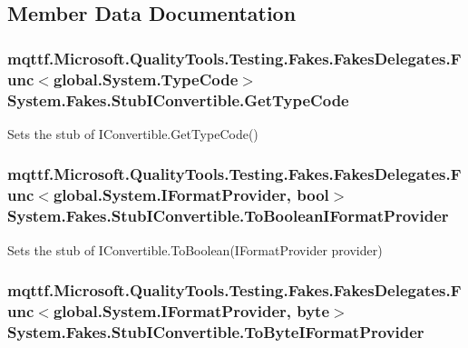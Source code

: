 \subsection{Member Data Documentation}
\hypertarget{class_system_1_1_fakes_1_1_stub_i_convertible_afcb4fd2ad35d314c92a231f3d121a55d}{
\subsubsection[{Get\-Type\-Code}]{\setlength{\rightskip}{0pt plus 5cm}mqttf.\-Microsoft.\-Quality\-Tools.\-Testing.\-Fakes.\-Fakes\-Delegates.\-Func$<$global.\-System.\-Type\-Code$>$ System.\-Fakes.\-Stub\-I\-Convertible.\-Get\-Type\-Code}}\label{class_system_1_1_fakes_1_1_stub_i_convertible_afcb4fd2ad35d314c92a231f3d121a55d}


Sets the stub of I\-Convertible.\-Get\-Type\-Code()

\hypertarget{class_system_1_1_fakes_1_1_stub_i_convertible_aed2935f0f946256fdf8cf2a4b0d0b4e4}{
\subsubsection[{To\-Boolean\-I\-Format\-Provider}]{\setlength{\rightskip}{0pt plus 5cm}mqttf.\-Microsoft.\-Quality\-Tools.\-Testing.\-Fakes.\-Fakes\-Delegates.\-Func$<$global.\-System.\-I\-Format\-Provider, bool$>$ System.\-Fakes.\-Stub\-I\-Convertible.\-To\-Boolean\-I\-Format\-Provider}}\label{class_system_1_1_fakes_1_1_stub_i_convertible_aed2935f0f946256fdf8cf2a4b0d0b4e4}


Sets the stub of I\-Convertible.\-To\-Boolean(\-I\-Format\-Provider provider)

\hypertarget{class_system_1_1_fakes_1_1_stub_i_convertible_a94d48c953053fa112e68f9856fe72226}{
\subsubsection[{To\-Byte\-I\-Format\-Provider}]{\setlength{\rightskip}{0pt plus 5cm}mqttf.\-Microsoft.\-Quality\-Tools.\-Testing.\-Fakes.\-Fakes\-Delegates.\-Func$<$global.\-System.\-I\-Format\-Provider, byte$>$ System.\-Fakes.\-Stub\-I\-Convertible.\-To\-Byte\-I\-Format\-Provider}}\label{class_system_1_1_fakes_1_1_stub_i_convertible_a94d48c953053fa112e68f9856fe72226}


